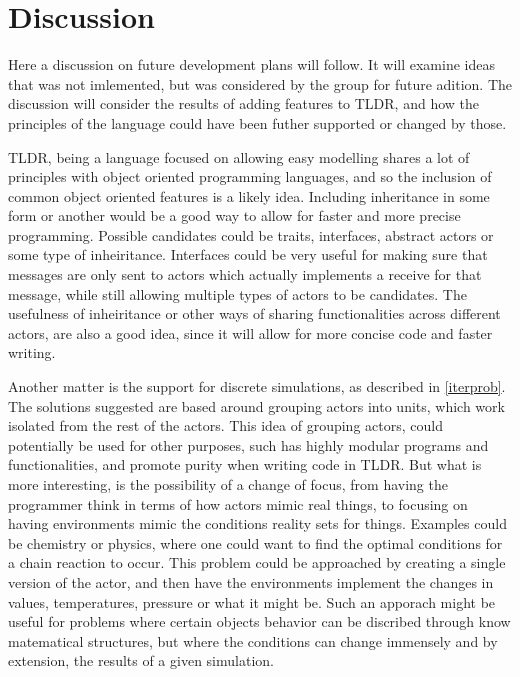 \chapter{Discussion}

Here a discussion on future development plans will follow. It will examine ideas that was not imlemented, but was considered by the group for future adition. The discussion will consider the results of adding features to TLDR, and how the principles of the language could have been futher supported or changed by those.

TLDR, being a language focused on allowing easy modelling shares a lot of principles with object oriented programming languages, and so the inclusion of common object oriented features is a likely idea. Including inheritance in some form or another would be a good way to allow for faster and more precise programming. Possible candidates could be traits, interfaces, abstract actors or some type of inheiritance. Interfaces could be very useful for making sure that messages are only sent to actors which actually implements a receive for that message, while still allowing multiple types of actors to be candidates. The usefulness of inheiritance or other ways of sharing functionalities across different actors, are also a good idea, since it will allow for more concise code and faster writing.

Another matter is the support for discrete simulations, as described in \cref{iterprob}. The solutions suggested are based around grouping actors into units, which work isolated from the rest of the actors. This idea of grouping actors, could potentially be used for other purposes, such has highly modular programs and functionalities, and promote purity when writing code in TLDR. But what is more interesting, is the possibility of a change of focus, from having the programmer think in terms of how actors mimic real things, to focusing on having environments mimic the conditions reality sets for things. Examples could be chemistry or physics, where one could want to find the optimal conditions for a chain reaction to occur. This problem could be approached by creating a single version of the actor, and then have the environments implement the changes in values, temperatures, pressure or what it might be. Such an apporach might be useful for problems where certain objects behavior can be discribed through know matematical structures, but where the conditions can change immensely and by extension, the results of a given simulation.

